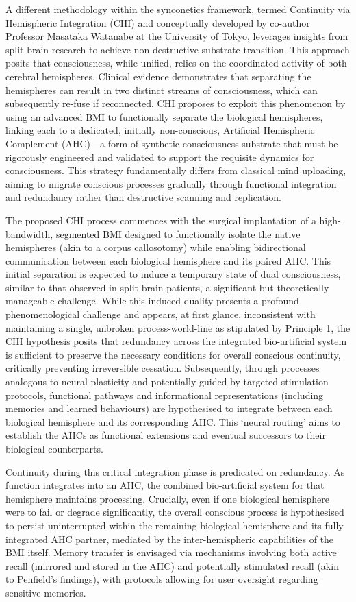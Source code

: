 \documentclass[10pt]{article}
\begin{document}
\begin{sloppypar}
  A different methodology within the synconetics framework, termed Continuity via Hemispheric Integration (CHI) and conceptually developed by co-author Professor Masataka Watanabe at the University of Tokyo, leverages insights from split-brain research to achieve non-destructive substrate transition. This approach posits that consciousness, while unified, relies on the coordinated activity of both cerebral hemispheres. Clinical evidence demonstrates that separating the hemispheres can result in two distinct streams of consciousness, which can subsequently re-fuse if reconnected. CHI proposes to exploit this phenomenon by using an advanced BMI to functionally separate the biological hemispheres, linking each to a dedicated, initially non-conscious, Artificial Hemispheric Complement (AHC)—a form of synthetic consciousness substrate that must be rigorously engineered and validated to support the requisite dynamics for consciousness. This strategy fundamentally differs from classical mind uploading, aiming to migrate conscious processes gradually through functional integration and redundancy rather than destructive scanning and replication.

  The proposed CHI process commences with the surgical implantation of a high-bandwidth, segmented BMI designed to functionally isolate the native hemispheres (akin to a corpus callosotomy) while enabling bidirectional communication between each biological hemisphere and its paired AHC. This initial separation is expected to induce a temporary state of dual consciousness, similar to that observed in split-brain patients, a significant but theoretically manageable challenge. While this induced duality presents a profound phenomenological challenge and appears, at first glance, inconsistent with maintaining a single, unbroken process-world-line as stipulated by Principle 1, the CHI hypothesis posits that redundancy across the integrated bio-artificial system is sufficient to preserve the necessary conditions for overall conscious continuity, critically preventing irreversible cessation. Subsequently, through processes analogous to neural plasticity and potentially guided by targeted stimulation protocols, functional pathways and informational representations (including memories and learned behaviours) are hypothesised to integrate between each biological hemisphere and its corresponding AHC. This ‘neural routing’ aims to establish the AHCs as functional extensions and eventual successors to their biological counterparts.

  Continuity during this critical integration phase is predicated on redundancy. As function integrates into an AHC, the combined bio-artificial system for that hemisphere maintains processing. Crucially, even if one biological hemisphere were to fail or degrade significantly, the overall conscious process is hypothesised to persist uninterrupted within the remaining biological hemisphere and its fully integrated AHC partner, mediated by the inter-hemispheric capabilities of the BMI itself. Memory transfer is envisaged via mechanisms involving both active recall (mirrored and stored in the AHC) and potentially stimulated recall (akin to Penfield’s findings), with protocols allowing for user oversight regarding sensitive memories.


\end{sloppypar}
\end{document}

